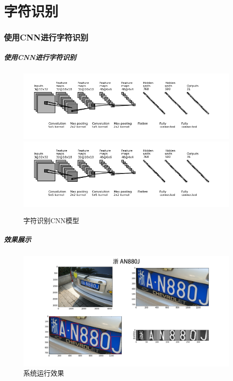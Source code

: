 \documentclass[UTF8]{beamer}
\begin{document}
\part{字符识别}

\section{使用CNN进行字符识别}

\begin{frame}
  \frametitle{使用CNN进行字符识别}

  \begin{figure}[ht]
    \centering
    {\includegraphics[height=0.25\textheight, keepaspectratio]{./Figure/RecognitionChinese.png}}
    {\includegraphics[height=0.25\textheight, keepaspectratio]{./Figure/RecognitionAlnum.png}}
    \caption{字符识别CNN模型} \label{Fig:RecognitionCNN}
  \end{figure}
\end{frame}

\begin{frame}
  \frametitle{效果展示}

  \begin{figure}[ht]
    \centering
    \includegraphics[width=1.0\linewidth]{./Figure/End2EndDemo2.png}
    \caption{系统运行效果}\label{Fig:End2EndDemo}
  \end{figure}
\end{frame}
\end{document}
